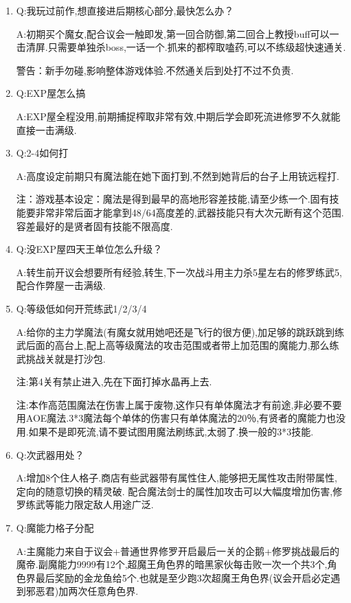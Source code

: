 \begin{enumerate}
	\item
	Q:我玩过前作,想直接进后期核心部分,最快怎么办？

	A:初期买个魔女,配合议会一触即发,第一回合防御,第二回合上教授buff可以一击清屏.只需要单独杀boss,一话一个.抓来的都榨取嗑药,可以不练级超快速通关.

	警告：新手勿碰,影响整体游戏体验.不然通关后到处打不过不负责.


	\item
	Q:EXP屋怎么搞

	A:EXP屋全程没用,前期捕捉榨取非常有效,中期后学会即死流进修罗不久就能直接一击满级.


	\item
	Q:2-4如何打

	A:高度设定前期只有魔法能在她下面打到,不然到她背后的台子上用铳远程打.

	注：游戏基本设定：魔法是得到最早的高地形容差技能,请至少练一个.固有技能要非常非常后面才能拿到48/64高度差的,武器技能只有大次元断有这个范围.容差最好的是贤者固有技能不限高度.

	\item
	Q:没EXP屋四天王单位怎么升级？

	A:转生前开议会想要所有经验,转生,下一次战斗用主力杀5星左右的修罗练武5,配合作弊屋一击满级.

	\item
	Q:等级低如何开荒练武1/2/3/4

	A:给你的主力学魔法(有魔女就用她吧还是飞行的很方便),加足够的跳跃跳到练武后面的高台上,配上高等级魔法的攻击范围或者带上加范围的魔能力,那么练武挑战关就是打沙包.

	注:第4关有禁止进入,先在下面打掉水晶再上去.

	注:本作高范围魔法在伤害上属于废物,这作只有单体魔法才有前途,非必要不要用AOE魔法.3*3魔法每个单体的伤害只有单体魔法的20％,有贤者的魔能力也没用.如果不是即死流,请不要试图用魔法刷练武,太弱了.换一般的3*3技能.

	\item
	Q:次武器用处？

	A:增加8个住人格子.商店有些武器带有属性住人,能够把无属性攻击附带属性,定向的随意切换的精灵破.
	配合魔法剑士的属性加攻击可以大幅度增加伤害,修罗练武等能力限定敌人用途广泛.

	\item
	Q:魔能力格子分配

	A:主魔能力来自于议会+普通世界修罗开启最后一关的企鹅+修罗挑战最后的魔帝.副魔能力9999有12个,超魔王角色界的暗黑家伙每击败一次一个共3个,角色界最后奖励的金龙鱼给5个.也就是至少跑3次超魔王角色界(议会开启必定遇到邪恶君)加两次任意角色界.


\end{enumerate}
